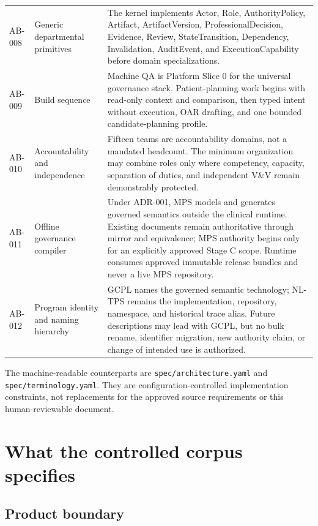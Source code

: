 \documentclass[11pt,letterpaper]{article}
\begin{document}
\begin{small}
\begin{longtable}{@{}L{0.14\textwidth}L{0.29\textwidth}L{0.47\textwidth}@{}}
\addlinespace[2pt]
AB-008 & Generic departmental primitives & The kernel implements Actor, Role, AuthorityPolicy, Artifact, ArtifactVersion, ProfessionalDecision, Evidence, Review, StateTransition, Dependency, Invalidation, AuditEvent, and ExecutionCapability before domain specializations. \\
\addlinespace[2pt]
AB-009 & Build sequence & Machine QA is Platform Slice 0 for the universal governance stack. Patient-planning work begins with read-only context and comparison, then typed intent without execution, OAR drafting, and one bounded candidate-planning profile. \\
\addlinespace[2pt]
AB-010 & Accountability and independence & Fifteen teams are accountability domains, not a mandated headcount. The minimum organization may combine roles only where competency, capacity, separation of duties, and independent V\&V remain demonstrably protected. \\
\addlinespace[2pt]
AB-011 & Offline governance compiler & Under ADR-001, MPS models and generates governed semantics outside the clinical runtime. Existing documents remain authoritative through mirror and equivalence; MPS authority begins only for an explicitly approved Stage C scope. Runtime consumes approved immutable release bundles and never a live MPS repository. \\
\addlinespace[2pt]
AB-012 & Program identity and naming hierarchy & GCPL names the governed semantic technology; NL-TPS remains the implementation, repository, namespace, and historical trace alias. Future descriptions may lead with GCPL, but no bulk rename, identifier migration, new authority claim, or change of intended use is authorized. \\
\end{longtable}
\end{small}

The machine-readable counterparts are \texttt{spec/architecture.yaml} and \texttt{spec/terminology.yaml}. They are configuration-controlled implementation constraints, not replacements for the approved source requirements or this human-reviewable document.

\section{What the controlled corpus specifies}

\subsection{Product boundary}
\end{document}

